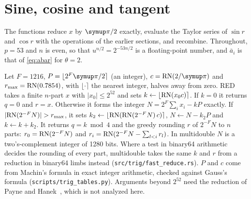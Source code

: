 
\section{Sine, cosine and tangent}\label{sec:trig}

The functions reduce $x$ by $\cpi/2$ exactly, evaluate the Taylor series of $\sin r$ and $\cos r$ with the operations
of the earlier sections, and recombine. Throughout, $p = 53$ and $n$ is even, so that $u^{n/2} =
2^{-53n/2}$ is a floating-point number, and $\bar a_i$ is that of \eqref{eq:abar} for $\theta = 2$.

 Let $F = 1216$, $P = \lfloor 2^F\cpi/2 \rceil$ (an integer), $c = \RN(2/\cpi)$ and $r_{\max} =
\mathrm{RN}(0.7854)$, with $\lfloor\cdot\rceil$ the nearest integer, halves away from zero. RED takes a finite $n$-part $x$ with
$|x_0| \le 2^{52}$ and sets $k \gets \lfloor\mathrm{RN}(x_0c)\rceil$. If $k = 0$ it returns $q = 0$ and $r = x$. Otherwise
it forms the integer $N = 2^F\sum_i x_i - kP$ exactly. If $|\mathrm{RN}(2^{-F}N)| > r_{\max}$, it sets $k_2 \gets
\lfloor\mathrm{RN}(\mathrm{RN}(2^{-F}N)\,c)\rceil$, $N \gets N - k_2P$ and $k \gets k + k_2$. It returns $q = k \bmod 4$ and the
greedy rounding $r$ of $2^{-F}N$ to $n$ parts: $r_0 = \mathrm{RN}(2^{-F}N)$ and $r_i = \mathrm{RN}(2^{-F}N - \sum_{l<i}r_l)$. In
multidouble $N$ is a two's-complement integer of 1280 bits. Where a test in binary64 arithmetic decides the rounding of
every part, multidouble takes the same $k$ and $r$ from a reduction in binary64 limbs instead
(\texttt{src/trig/fast\_reduce.rs}). $P$ and $c$ come from Machin's formula in exact integer
arithmetic, checked against Gauss's formula (\texttt{scripts/trig\_tables.py}). Arguments beyond $2^{52}$ need the reduction of Payne and
Hanek~\cite{PH83}, which is not analyzed here.

